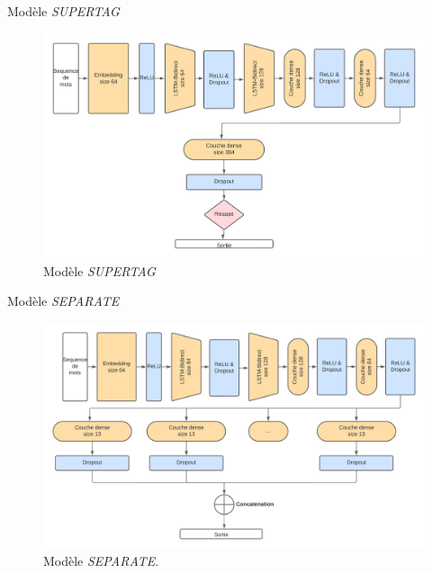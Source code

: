 \documentclass[11pt]{beamer}
\begin{document}
\begin{frame}{Modèle \textit{SUPERTAG}}
    \begin{figure}
        \centering
        \includegraphics[width=\textwidth]{get_morphy_supertag.png}
        \caption{Modèle \textit{SUPERTAG}}
        \label{fig: model supertag}
    \end{figure}
\end{frame}

\begin{frame}{Modèle \textit{SEPARATE}}
    \begin{figure}
        \centering
        \includegraphics[width=\textwidth]{get_morphy_separate.png}
        \caption{Modèle \textit{SEPARATE}.}
        \label{fig: model separate}
    \end{figure}
\end{frame}
\end{document}
